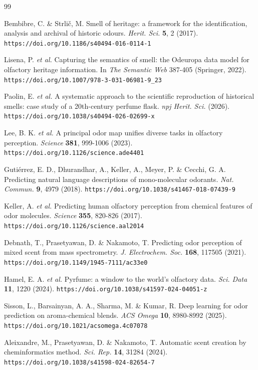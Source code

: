 \documentclass[11pt]{article}
\begin{document}
\begin{thebibliography}{99}

Bembibre, C. \& Strlič, M. Smell of heritage: a framework for the identification, analysis and archival of historic odours. \emph{Herit. Sci.} \textbf{5}, 2 (2017). \nolinkurl{https://doi.org/10.1186/s40494-016-0114-1}

Lisena, P. \emph{et al.} Capturing the semantics of smell: the Odeuropa data model for olfactory heritage information. In \emph{The Semantic Web} 387-405 (Springer, 2022). \nolinkurl{https://doi.org/10.1007/978-3-031-06981-9_23}

Paolin, E. \emph{et al.} A systematic approach to the scientific reproduction of historical smells: case study of a 20th-century perfume flask. \emph{npj Herit. Sci.} (2026). \nolinkurl{https://doi.org/10.1038/s40494-026-02699-x}

Lee, B. K. \emph{et al.} A principal odor map unifies diverse tasks in olfactory perception. \emph{Science} \textbf{381}, 999-1006 (2023). \nolinkurl{https://doi.org/10.1126/science.ade4401}

Gutiérrez, E. D., Dhurandhar, A., Keller, A., Meyer, P. \& Cecchi, G. A. Predicting natural language descriptions of mono-molecular odorants. \emph{Nat. Commun.} \textbf{9}, 4979 (2018). \nolinkurl{https://doi.org/10.1038/s41467-018-07439-9}

Keller, A. \emph{et al.} Predicting human olfactory perception from chemical features of odor molecules. \emph{Science} \textbf{355}, 820-826 (2017). \nolinkurl{https://doi.org/10.1126/science.aal2014}

Debnath, T., Prasetyawan, D. \& Nakamoto, T. Predicting odor perception of mixed scent from mass spectrometry. \emph{J. Electrochem. Soc.} \textbf{168}, 117505 (2021). \nolinkurl{https://doi.org/10.1149/1945-7111/ac33e0}

Hamel, E. A. \emph{et al.} Pyrfume: a window to the world's olfactory data. \emph{Sci. Data} \textbf{11}, 1220 (2024). \nolinkurl{https://doi.org/10.1038/s41597-024-04051-z}

Sisson, L., Barsainyan, A. A., Sharma, M. \& Kumar, R. Deep learning for odor prediction on aroma-chemical blends. \emph{ACS Omega} \textbf{10}, 8980-8992 (2025). \nolinkurl{https://doi.org/10.1021/acsomega.4c07078}

Aleixandre, M., Prasetyawan, D. \& Nakamoto, T. Automatic scent creation by cheminformatics method. \emph{Sci. Rep.} \textbf{14}, 31284 (2024). \nolinkurl{https://doi.org/10.1038/s41598-024-82654-7}


\end{thebibliography}
\end{document}
